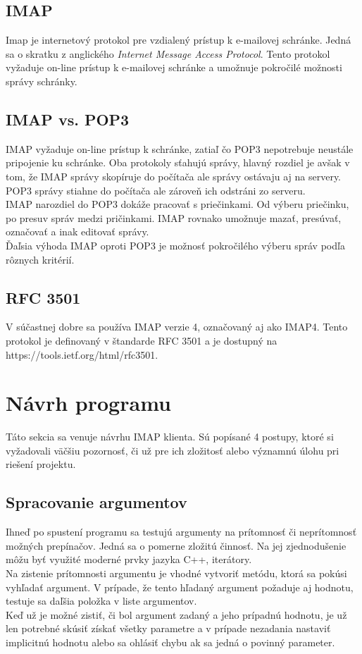 \documentclass{article}
\begin{document}
\subsection{IMAP}
Imap je internetový protokol pre vzdialený prístup k e-mailovej schránke. Jedná sa o skratku z anglického \textit{Internet Message Access Protocol}. Tento protokol vyžaduje on-line prístup k e-mailovej schránke a umožnuje pokročilé možnosti správy schránky.
\subsection{IMAP vs. POP3}
IMAP vyžaduje on-line prístup k schránke, zatiaľ čo POP3 nepotrebuje neustále pripojenie ku schránke. Oba protokoly sťahujú správy, hlavný rozdiel je avšak v tom, že IMAP správy skopíruje do počítača ale správy ostávaju aj na servery. POP3 správy stiahne do počítača ale zároveň ich odstráni zo serveru.\\
IMAP narozdiel do POP3 dokáže pracovať s priečinkami. Od výberu priečinku, po presuv správ medzi pričinkami. IMAP rovnako umožnuje mazať, presúvať, označovať a inak editovať správy.\\
Ďaľsia výhoda IMAP oproti POP3 je možnosť pokročilého výberu správ podľa rôznych kritérií.
\subsection{RFC 3501}
V súčastnej dobre sa používa IMAP verzie 4, označovaný aj ako IMAP4. Tento protokol je definovaný v štandarde RFC 3501 a je dostupný na https://tools.ietf.org/html/rfc3501.

\section{Návrh programu}
Táto sekcia sa venuje návrhu IMAP klienta. Sú popísané 4 postupy, ktoré si vyžadovali väčšiu pozornosť, či už pre ich zložitosť alebo významnú úlohu pri riešení projektu.
\subsection{Spracovanie argumentov}
Ihneď po spustení programu sa testujú argumenty na prítomnosť či neprítomnosť možných prepínačov. Jedná sa o pomerne zložitú činnosť. Na jej zjednodušenie môžu byť využité moderné prvky jazyka C++, iterátory.\\ Na zistenie prítomnosti argumentu je vhodné vytvoriť metódu, ktorá sa pokúsi vyhľadať argument. V prípade, že tento hľadaný argument požaduje aj hodnotu, testuje sa daľšia položka v liste argumentov.\\
Keď už je možné zistiť, či bol argument zadaný a jeho prípadnú hodnotu, je už len potrebné skúsiť získať všetky parametre a v prípade nezadania nastaviť implicitnú hodnotu alebo sa ohlásiť chybu ak sa jedná o povinný parameter.
\end{document}
